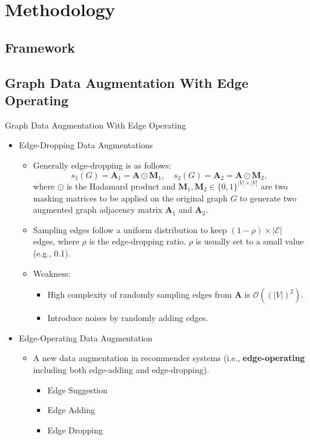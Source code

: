 \documentclass[t]{beamer}
\begin{document}
\section{Methodology}
\label{sec:model}

\subsection{Framework}

\subsection{Graph Data Augmentation With Edge Operating}
\label{sec:data-aug}

\begin{frame}[allowframebreaks]{Graph Data Augmentation With Edge Operating}
\setlistsep{2ex}{2ex}{0ex}
\begin{itemize}
    \item Edge-Dropping Data Augmentations
    \begin{itemize}
        \item Generally edge-dropping is as follows:
\begin{equation*}
s_{1}(G) = \mathbf{A}_1 = \mathbf{A} \odot \mathbf{M}_1, \quad s_{2}(G) = \mathbf{A}_2 = \mathbf{A} \odot \mathbf{M}_{2},
\end{equation*}
where $\odot$ is the Hadamard product and $\mathbf{M}_1, \mathbf{M}_2 \in \{0, 1\}^{|V| \times |V|}$ are two masking matrices to be applied on the original graph $G$ to generate two augmented graph adjacency matrix $\mathbf{A}_1$ and $\mathbf{A}_2$.
        \item Sampling edges follow a uniform distribution to keep $(1-\rho)\times |\mathcal{E}|$ edges, where $\rho$ is the edge-dropping ratio. $\rho$ is usually set to a small value (e.g., 0.1).
        \item Weakness:
        \begin{itemize}
            \item High complexity of randomly sampling edges from $\mathbf{A}$ is $\mathcal{O}((|V|)^2)$.
            \item Introduce noises by randomly adding edges.
        \end{itemize}
    \end{itemize}

\framebreak

    \item Edge-Operating Data Augmentation
    \begin{itemize}
        \item A new data augmentation in recommender systems (i.e., \textbf{edge-operating} including both edge-adding and edge-dropping).
        \begin{itemize}
            \item Edge Suggestion
            \item Edge Adding
            \item Edge Dropping
        \end{itemize}
    \end{itemize}
\vspace{2em}


\end{itemize}
\end{frame}
\end{document}

